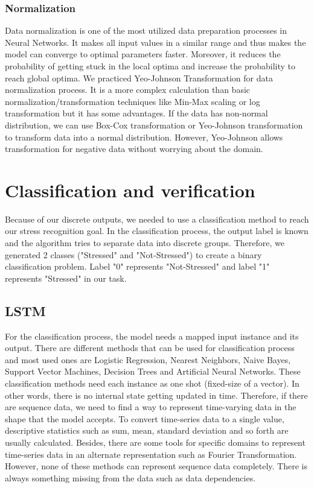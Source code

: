 \documentclass[3p,times,procedia]{elsarticle}
\begin{document}
\subsubsection{Normalization}
Data normalization is one of the most utilized data preparation processes in Neural Networks. It makes all input values in a similar range and thus makes the model can converge to optimal parameters faster. Moreover, it reduces the probability of getting stuck in the local optima and increase the probability to reach global optima. We practiced Yeo-Johnson Transformation \cite{Yeo2000} for data normalization process. It is a more complex calculation than basic normalization/transformation techniques like Min-Max scaling or log transformation but it has some advantages. If the data has non-normal distribution, we can use Box-Cox transformation or Yeo-Johnson transformation to transform data into a normal distribution. However, Yeo-Johnson allows transformation for negative data without worrying about the domain. 


\section{Classification and verification}
\label{classification}
Because of our discrete outputs, we needed to use a classification method to reach our stress recognition goal. In the classification process, the output label is known and the algorithm tries to separate data into discrete groups. Therefore, we generated 2 classes ("Stressed" and "Not-Stressed") to create a binary classification problem. Label "0" represents "Not-Stressed" and label "1" represents "Stressed" in our task.

\subsection{LSTM}
For the classification process, the model needs a mapped input instance and its output. There are different methods that can be used for classification process and most used ones are Logistic Regression, Nearest Neighbors, Naive Bayes, Support Vector Machines, Decision Trees and Artificial Neural Networks. These classification methods need each instance as one shot (fixed-size of a vector). In other words, there is no internal state getting updated in time. Therefore, if there are sequence data, we need to find a way to represent time-varying data in the shape that the model accepts. To convert time-series data to a single value, descriptive statistics such as sum, mean, standard deviation and so forth are usually calculated. Besides, there are some tools for specific domains to represent time-series data in an alternate representation such as Fourier Transformation. However, none of these methods can represent sequence data completely. There is always something missing from the data such as data dependencies.
\end{document}
